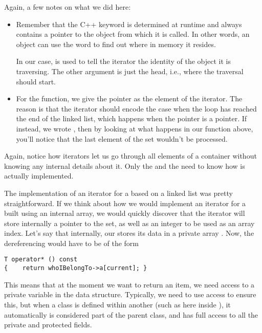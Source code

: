 Again, a few notes on what we did here:
\begin{itemize}
\item Remember that the C++ keyword  is determined at
  runtime and always contains a pointer to the object from which it is
  called. In other words, an object can use the word  to
  find out where in memory it resides.
  
  In our case,  is used to tell the iterator the identity
  of the object it is traversing. The other argument is just the head,
  i.e., where the traversal should start.
\item For the  function, we give the  pointer
  as the  element of the iterator.
  The reason is that the  iterator should encode the case
  when the  loop has reached the end of the linked list,
  which happens when the pointer is a  pointer. 
  If instead, we wrote ,
  then by looking at what happens in our  function above,
  you'll notice that the last element of the set wouldn't be processed.
\end{itemize}

Again, notice how iterators let us go through all elements of a
container without knowing any internal details about it. 
Only the  and the  need to know
how  is actually implemented.

The implementation of an iterator for a  based on a linked
list was pretty straightforward. If we think about how we would
implement an iterator for a  built using an internal array,
we would quickly discover that the iterator will store internally a
pointer to the set, as well as an integer to be used as an array
index. 
Let's say that internally, our  stores its data in a
private array .
Now, the dereferencing would have to be of the form
\begin{verbatim}
T operator* () const
{    return whoIBelongTo->a[current]; }
\end{verbatim}

This means that at the moment we want to return an item, we need
access to a private variable in the data structure.
Typically, we need to use  access to ensure this, but
when a class is defined within another (such as here
 inside ), it automatically is
considered part of the parent class, and has full access to all the
private and protected fields.


